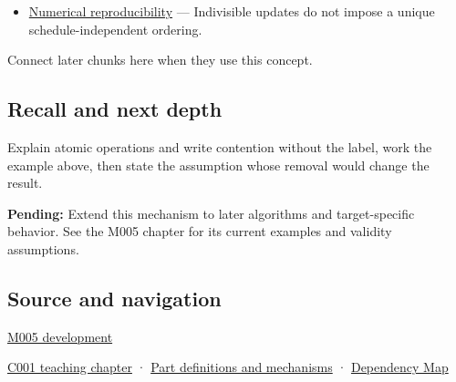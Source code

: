 \begin{itemize}
\tightlist
\item
  \hyperref[appendix-5f1a2c3f97ff]{Numerical reproducibility} --- Indivisible updates do not impose a unique schedule-independent ordering.
\end{itemize}

Connect later chunks here when they use this concept.

\subsection{Recall and next depth}\label{appendix-e12d1b03fefb-recall-and-next-depth}

Explain atomic operations and write contention without the label, work the example above, then state the assumption whose removal would change the result.

\textbf{Pending:} Extend this mechanism to later algorithms and target-specific behavior. See the M005 chapter for its current examples and validity assumptions.

\subsection{Source and navigation}\label{appendix-e12d1b03fefb-source-and-navigation}

\hyperref[01-foundations-i-ch001-when-arithmetic-meets-uncertainty]{M005 development}

\hyperref[01-foundations-i-ch001-from-a-signal-to-an-interpretation]{C001 teaching chapter} · \hyperref[appendix-fd090d982a15]{Part definitions and mechanisms} · \hyperref[appendix-4ad47bdd269a]{Dependency Map}
